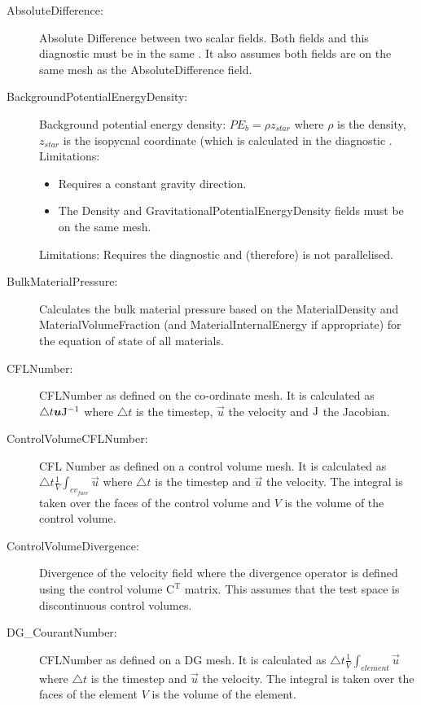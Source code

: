\begin{description}
\item[AbsoluteDifference:]Absolute Difference between two scalar fields. Both fields and this diagnostic  must be in the same . It also assumes both fields are on the same mesh as the AbsoluteDifference field.  
\item[BackgroundPotentialEnergyDensity:]Background potential energy density: $PE_b = \rho z_{star}$ where $\rho$ is the density, $z_{star}$ is the isopycnal coordinate (which is calculated in the diagnostic . \\Limitations: 
	\begin{itemize}
	\item Requires a constant gravity direction. 
	\item The Density and GravitationalPotentialEnergyDensity fields must be on the same mesh. 
	\end{itemize}
Limitations: Requires the diagnostic  and (therefore) is not parallelised.
\item[BulkMaterialPressure:]Calculates the bulk material pressure based on the MaterialDensity and MaterialVolumeFraction (and MaterialInternalEnergy if appropriate) for the equation of state of all materials.
\item[CFLNumber:]CFLNumber as defined on the co-ordinate mesh. It is calculated as $\triangle t {\mbox{\boldmath$u$}} \mathrm{J}^{-1}$ where $\triangle t$ is the timestep, $\vec{u}$ the velocity and $\mathrm{J}$ the Jacobian. 
\item[ControlVolumeCFLNumber:]CFL Number as defined on a control volume mesh. It is calculated as $\triangle t \frac{1}{V} \int _{cv_{face}} \vec{u}$ where $\triangle t$ is the timestep and $\vec{u}$ the velocity. The integral is taken over the faces of the control volume and $V$ is the volume of the control volume.
\item[ControlVolumeDivergence:]Divergence of the velocity field where the divergence operator is defined using the control volume $\mathrm{C}^\mathrm{T}$ matrix. This assumes that the test space is discontinuous control volumes.
\item[DG\_CourantNumber:]CFLNumber as defined on a DG mesh. It is calculated as $\triangle t \frac{1}{V} \int _{element} \vec{u}$ where $\triangle t$ is the timestep and $\vec{u}$ the velocity. The integral is taken over the faces of the element $V$ is the volume of the element.

\end{description}
